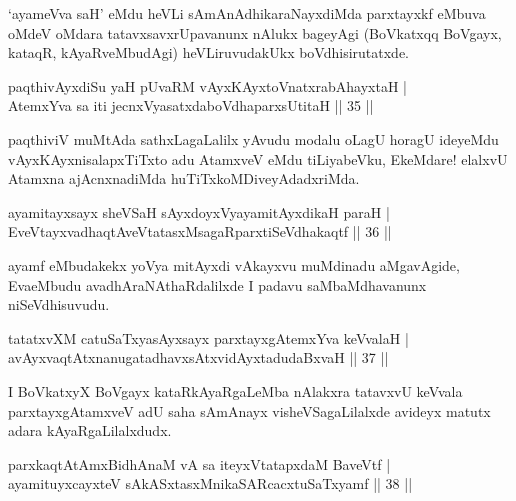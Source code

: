 \begin{artha}
`ayameVva saH' eMdu heVLi sAmAnAdhikaraNayxdiMda parxtayxkf eMbuva oMdeV oMdara tatavxsavxrUpavanunx nAlukx bageyAgi (BoVkatxqq BoVgayx, kataqR, kAyaRveMbudAgi) heVLiruvudakUkx boVdhisirutatxde.
\end{artha}


\begin{shl}
paqthivAyxdiSu yaH pUvaRM vAyxKAyxtoV\s natxrabAhayxtaH |\\
AtemxYva sa iti jecnxVyasatxdaboVdhaparxsUtitaH \hfill || 35 ||
\end{shl}

\begin{artha}
paqthiviV muMtAda sathxLagaLalilx yAvudu modalu oLagU horagU ideyeMdu
vAyxKAyxnisalapxTiTxto adu AtamxveV eMdu tiLiyabeVku, EkeMdare! elalxvU
Atamxna ajAcnxnadiMda huTiTxkoMDiveyAdadxriMda.
\end{artha}

\begin{shl}
ayamitayxsayx sheVSaH sAyxdoyxVya\s yamitAyxdikaH paraH |\\
EveVtayxvadhaqtAveVtatasxMsagaRparxtiSeVdhakaqtf \hfill || 36 ||
\end{shl}

\begin{artha}
ayamf eMbudakekx yoV\s ya mitAyxdi vAkayxvu muMdinadu aMgavAgide, EvaeMbudu avadhAraNAthaRdalilxde I padavu saMbaMdhavanunx niSeVdhisuvudu.
\end{artha}

\begin{shl}
tatatxvXM catuSaTxyasAyxsayx parxtayxgAtemxYva keVvalaH |\\
avAyxvaqtAtxnanugatadhavxsAtxvidAyxtadudaBxvaH \hfill || 37 ||
\end{shl}

\begin{artha}
I BoVkatxyX BoVgayx kataRkAyaRgaLeMba nAlakxra tatavxvU keVvala parxtayxgAtamxveV adU saha sAmAnayx visheVSagaLilalxde avideyx matutx adara kAyaRgaLilalxdudx.
\end{artha}

\begin{shl}
parxkaqtAtAmxBidhAnaM vA sa iteyxVtatapxdaM BaveVtf |\\
ayamituyxcayxteV sAkASxtasxMnikaSARcacxtuSaTxyamf \hfill || 38 ||
\end{shl}

